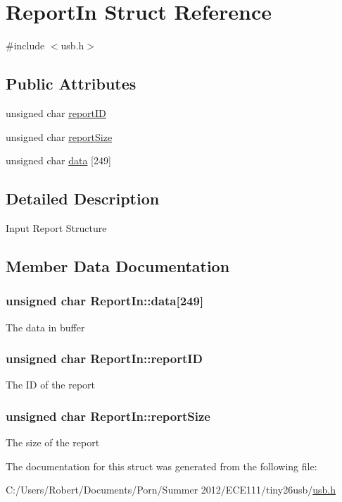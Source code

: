 \hypertarget{struct_report_in}{\section{Report\-In Struct Reference}
\label{struct_report_in}
}


{\ttfamily \#include $<$usb.\-h$>$}

\subsection*{Public Attributes}
\begin{DoxyCompactItemize}
\item 
unsigned char \hyperlink{struct_report_in_a5ac6450eb2bdc09493c844d52f00c8b9}{report\-I\-D}
\item 
unsigned char \hyperlink{struct_report_in_af74d0d71e8e8c003bc294fb81231133c}{report\-Size}
\item 
unsigned char \hyperlink{struct_report_in_aa433aa75905cee70155a03b77e99445b}{data} \mbox{[}249\mbox{]}
\end{DoxyCompactItemize}


\subsection{Detailed Description}
Input Report Structure 

\subsection{Member Data Documentation}
\hypertarget{struct_report_in_aa433aa75905cee70155a03b77e99445b}{
\subsubsection[{data}]{\setlength{\rightskip}{0pt plus 5cm}unsigned char Report\-In\-::data\mbox{[}249\mbox{]}}}\label{struct_report_in_aa433aa75905cee70155a03b77e99445b}
The data in buffer \hypertarget{struct_report_in_a5ac6450eb2bdc09493c844d52f00c8b9}{
\subsubsection[{report\-I\-D}]{\setlength{\rightskip}{0pt plus 5cm}unsigned char Report\-In\-::report\-I\-D}}\label{struct_report_in_a5ac6450eb2bdc09493c844d52f00c8b9}
The I\-D of the report \hypertarget{struct_report_in_af74d0d71e8e8c003bc294fb81231133c}{
\subsubsection[{report\-Size}]{\setlength{\rightskip}{0pt plus 5cm}unsigned char Report\-In\-::report\-Size}}\label{struct_report_in_af74d0d71e8e8c003bc294fb81231133c}
The size of the report 

The documentation for this struct was generated from the following file\-:\begin{DoxyCompactItemize}
\item 
C\-:/\-Users/\-Robert/\-Documents/\-Porn/\-Summer 2012/\-E\-C\-E111/tiny26usb/\hyperlink{usb_8h}{usb.\-h}\end{DoxyCompactItemize}
